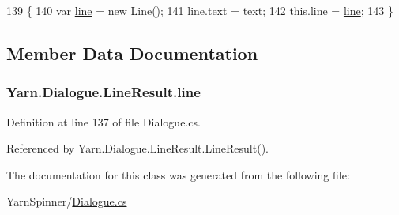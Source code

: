 \begin{DoxyCode}
139                                             \{
140                 var \hyperlink{a00122_abfbb0ea840b02acd0ecdc72c5b120257}{line} = \textcolor{keyword}{new} Line();
141                 line.text = text;
142                 this.line = \hyperlink{a00122_abfbb0ea840b02acd0ecdc72c5b120257}{line};
143             \}
\end{DoxyCode}


\subsection{Member Data Documentation}
\hypertarget{a00122_abfbb0ea840b02acd0ecdc72c5b120257}{
\subsubsection[{line}]{ Yarn.\-Dialogue.\-Line\-Result.\-line}}\label{a00122_abfbb0ea840b02acd0ecdc72c5b120257}


Definition at line 137 of file Dialogue.\-cs.



Referenced by Yarn.\-Dialogue.\-Line\-Result.\-Line\-Result().



The documentation for this class was generated from the following file\-:\begin{DoxyCompactItemize}
\item 
Yarn\-Spinner/\hyperlink{a00290}{Dialogue.\-cs}\end{DoxyCompactItemize}
